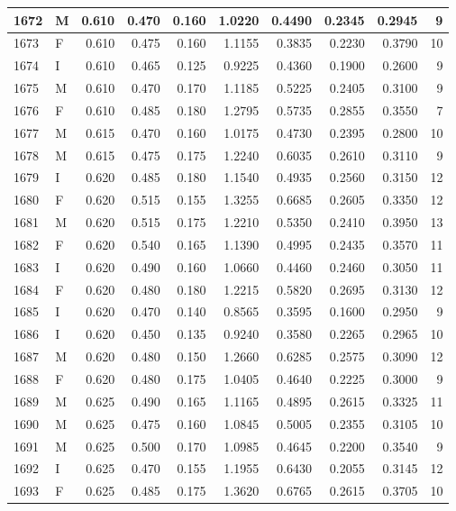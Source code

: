 \documentclass[9pt,twocolumn,twoside,]{pnas-new}
\begin{document}
\begin{tabular}{l|l|r|r|r|r|r|r|r|r}
\hline
1672 & M & 0.610 & 0.470 & 0.160 & 1.0220 & 0.4490 & 0.2345 & 0.2945 & 9\\
\hline
1673 & F & 0.610 & 0.475 & 0.160 & 1.1155 & 0.3835 & 0.2230 & 0.3790 & 10\\
\hline
1674 & I & 0.610 & 0.465 & 0.125 & 0.9225 & 0.4360 & 0.1900 & 0.2600 & 9\\
\hline
1675 & M & 0.610 & 0.470 & 0.170 & 1.1185 & 0.5225 & 0.2405 & 0.3100 & 9\\
\hline
1676 & F & 0.610 & 0.485 & 0.180 & 1.2795 & 0.5735 & 0.2855 & 0.3550 & 7\\
\hline
1677 & M & 0.615 & 0.470 & 0.160 & 1.0175 & 0.4730 & 0.2395 & 0.2800 & 10\\
\hline
1678 & M & 0.615 & 0.475 & 0.175 & 1.2240 & 0.6035 & 0.2610 & 0.3110 & 9\\
\hline
1679 & I & 0.620 & 0.485 & 0.180 & 1.1540 & 0.4935 & 0.2560 & 0.3150 & 12\\
\hline
1680 & F & 0.620 & 0.515 & 0.155 & 1.3255 & 0.6685 & 0.2605 & 0.3350 & 12\\
\hline
1681 & M & 0.620 & 0.515 & 0.175 & 1.2210 & 0.5350 & 0.2410 & 0.3950 & 13\\
\hline
1682 & F & 0.620 & 0.540 & 0.165 & 1.1390 & 0.4995 & 0.2435 & 0.3570 & 11\\
\hline
1683 & I & 0.620 & 0.490 & 0.160 & 1.0660 & 0.4460 & 0.2460 & 0.3050 & 11\\
\hline
1684 & F & 0.620 & 0.480 & 0.180 & 1.2215 & 0.5820 & 0.2695 & 0.3130 & 12\\
\hline
1685 & I & 0.620 & 0.470 & 0.140 & 0.8565 & 0.3595 & 0.1600 & 0.2950 & 9\\
\hline
1686 & I & 0.620 & 0.450 & 0.135 & 0.9240 & 0.3580 & 0.2265 & 0.2965 & 10\\
\hline
1687 & M & 0.620 & 0.480 & 0.150 & 1.2660 & 0.6285 & 0.2575 & 0.3090 & 12\\
\hline
1688 & F & 0.620 & 0.480 & 0.175 & 1.0405 & 0.4640 & 0.2225 & 0.3000 & 9\\
\hline
1689 & M & 0.625 & 0.490 & 0.165 & 1.1165 & 0.4895 & 0.2615 & 0.3325 & 11\\
\hline
1690 & M & 0.625 & 0.475 & 0.160 & 1.0845 & 0.5005 & 0.2355 & 0.3105 & 10\\
\hline
1691 & M & 0.625 & 0.500 & 0.170 & 1.0985 & 0.4645 & 0.2200 & 0.3540 & 9\\
\hline
1692 & I & 0.625 & 0.470 & 0.155 & 1.1955 & 0.6430 & 0.2055 & 0.3145 & 12\\
\hline
1693 & F & 0.625 & 0.485 & 0.175 & 1.3620 & 0.6765 & 0.2615 & 0.3705 & 10\\

\end{tabular}
\end{document}

